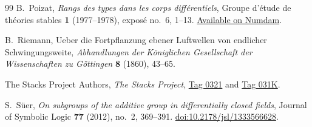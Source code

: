 \documentclass[11pt,a4paper]{amsart}
\theoremstyle{definition}
\begin{document}
\begin{thebibliography}{99}
B.~Poizat,
\emph{Rangs des types dans les corps diff\'erentiels},
Groupe d'\'etude de th\'eories stables
\textbf{1} (1977--1978), expos\'e no.~6, 1--13.
\href{https://www.numdam.org/item/STS_1977-1978__1__A6_0/}
{Available on Numdam}.

B.~Riemann,
Ueber die Fortpflanzung ebener Luftwellen von endlicher
Schwingungsweite,
\emph{Abhandlungen der K\"oniglichen Gesellschaft der
Wissenschaften zu G\"ottingen}
\textbf{8} (1860), 43--65.

The Stacks Project Authors,
\emph{The Stacks Project},
\href{https://stacks.math.columbia.edu/tag/0321}{Tag 0321}
and \href{https://stacks.math.columbia.edu/tag/031K}{Tag 031K}.

S.~S\"uer,
\emph{On subgroups of the additive group in differentially closed fields},
Journal of Symbolic Logic \textbf{77} (2012), no.~2, 369--391.
\href{https://doi.org/10.2178/jsl/1333566628}
{doi:10.2178/jsl/1333566628}.


\end{thebibliography}
\end{document}
